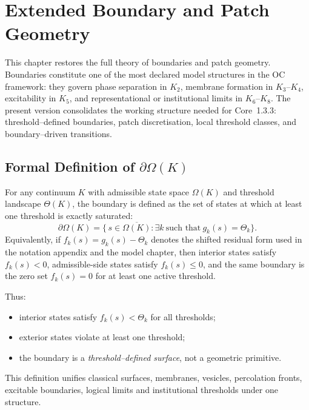 
\section{Extended Boundary and Patch Geometry}
\label{sec:boundary-extended}

This chapter restores the full theory of boundaries and patch geometry.
Boundaries constitute one of the most declared model structures in the OC framework:
they govern phase separation in \(K_2\), membrane formation in \(K_3\)--\(K_4\),
excitability in \(K_5\), and representational or institutional limits in
\(K_6\)--\(K_8\).
The present version consolidates the working structure needed for Core~1.3.3:
threshold–defined boundaries, patch discretisation, local threshold classes,
and boundary–driven transitions.

\subsection{Formal Definition of \texorpdfstring{$\partial\Omega(K)$}{boundary}}

For any continuum \(K\) with admissible state space \(\Omega(K)\) and threshold
landscape \(\Theta(K)\), the boundary is defined as the set of states at which
at least one threshold is exactly saturated:
\[
  \partial\Omega(K)
  =
  \big\{\, s \in \overline{\Omega(K)} :
          \exists k\ \text{such that}\ g_k(s) = \Theta_k \big\}.
\]
Equivalently, if \(f_k(s)=g_k(s)-\Theta_k\) denotes the shifted residual form
used in the notation appendix and the model chapter, then interior states
satisfy \(f_k(s)<0\), admissible-side states satisfy \(f_k(s)\le0\), and the
same boundary is the zero set \(f_k(s)=0\) for at least one active threshold.

Thus:
\begin{itemize}
    \item interior states satisfy \(f_k(s) < \Theta_k\) for all thresholds;
    \item exterior states violate at least one threshold;
    \item the boundary is a \emph{threshold–defined surface}, not a geometric
          primitive.
\end{itemize}

This definition unifies classical surfaces, membranes, vesicles,
percolation fronts, excitable boundaries, logical limits and institutional
thresholds under one structure.

